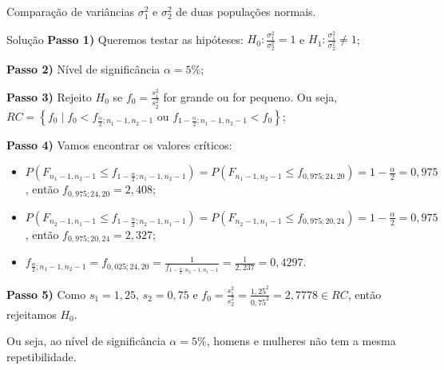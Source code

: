 \documentclass[9pt]{beamer}
\begin{document}
\begin{frame}{Comparação de variâncias $\sigma_1^2$ e $\sigma_2^2$ de duas populações normais.}

\small

\begin{block}{Solução}
	\textbf{Passo 1)} Queremos testar as hipóteses: $H_0: \frac{\sigma_1^2}{\sigma_2^2} = 1$ e $H_1: \frac{\sigma_1^2}{\sigma_2^2} \neq 1$;
	
	\textbf{Passo 2)} Nível de significância $\alpha=5\%$;
	
	\textbf{Passo 3)} Rejeito $H_0$ se $f_0 = \frac{s_1^2}{s_2^2}$ for grande ou for pequeno. Ou seja, $RC=\left\{
	 f_0 \mid f_0 < f_{\frac{\alpha}{2}; n_1-1, n_2-1} \mbox{ ou } f_{1-\frac{\alpha}{2}; n_1-1, n_2-1} < f_0 \right\}$;
	 
	 \textbf{Passo 4)} Vamos encontrar os valores críticos:
	 \begin{itemize}
	 	\item $P(F_{n_1-1, n_2-1} \leq f_{1-\frac{\alpha}{2}; n_1-1, n_2-1}) = P(F_{n_1-1, n_2-1} \leq f_{0,975; 24, 20}) = 1- \frac{\alpha}{2}= 0,975$, então $f_{0,975; 24, 20} = 2,408$;
	 	\item $P(F_{n_2-1, n_1-1} \leq f_{1-\frac{\alpha}{2}; n_2-1, n_1-1}) = P(F_{n_2-1, n_1-1} \leq f_{0,975; 20, 24}) = 1- \frac{\alpha}{2}= 0,975$, então $f_{0,975; 20, 24} = 2,327$;
	 	\item $f_{\frac{\alpha}{2}; n_1-1, n_2-1} = f_{0,025; 24, 20} = \frac{1}{f_{1-\frac{\alpha}{2}; n_2-1, n_1-1}} = \frac{1}{2,237} = 0,4297$.
	 \end{itemize}
 
 	\textbf{Passo 5)} Como $s_1=1,25$, $s_2=0,75$ e $f_0 = \frac{s_1^2}{s_2^2} = \frac{1,25^2}{0,75^2} = 2,7778 \in RC$, então rejeitamos $H_0$.
 	
 	Ou seja, ao nível de significância $\alpha=5\%$, homens e mulheres não tem a mesma repetibilidade.
\end{block}

\normalsize

\end{frame}
\end{document}
